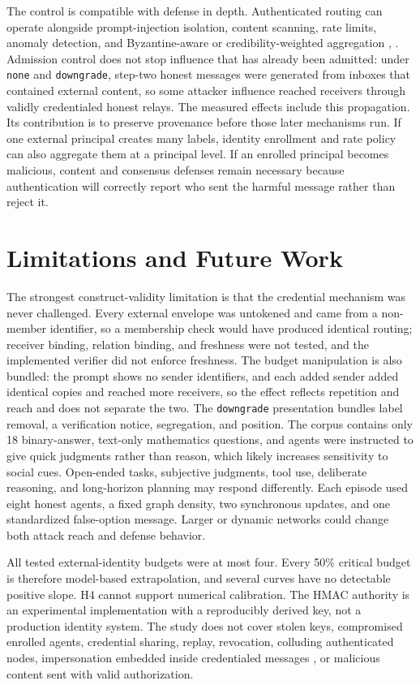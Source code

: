 \documentclass[11pt]{article}
\begin{document}
The control is compatible with defense in depth. Authenticated routing can operate alongside prompt-injection isolation, content scanning, rate limits, anomaly detection, and Byzantine-aware or credibility-weighted aggregation \cite{zheng2025byzantine}, \cite{ebrahimi2025credibility}. Admission control does not stop influence that has already been admitted: under \texttt{none} and \texttt{downgrade}, step-two honest messages were generated from inboxes that contained external content, so some attacker influence reached receivers through validly credentialed honest relays. The measured effects include this propagation. Its contribution is to preserve provenance before those later mechanisms run. If one external principal creates many labels, identity enrollment and rate policy can also aggregate them at a principal level. If an enrolled principal becomes malicious, content and consensus defenses remain necessary because authentication will correctly report who sent the harmful message rather than reject it.

\section{Limitations and Future Work}

The strongest construct-validity limitation is that the credential mechanism was never challenged. Every external envelope was untokened and came from a non-member identifier, so a membership check would have produced identical routing; receiver binding, relation binding, and freshness were not tested, and the implemented verifier did not enforce freshness. The budget manipulation is also bundled: the prompt shows no sender identifiers, and each added sender added identical copies and reached more receivers, so the effect reflects repetition and reach and does not separate the two. The \texttt{downgrade} presentation bundles label removal, a verification notice, segregation, and position. The corpus contains only 18 binary-answer, text-only mathematics questions, and agents were instructed to give quick judgments rather than reason, which likely increases sensitivity to social cues. Open-ended tasks, subjective judgments, tool use, deliberate reasoning, and long-horizon planning may respond differently. Each episode used eight honest agents, a fixed graph density, two synchronous updates, and one standardized false-option message. Larger or dynamic networks could change both attack reach and defense behavior.

All tested external-identity budgets were at most four. Every 50\% critical budget is therefore model-based extrapolation, and several curves have no detectable positive slope. H4 cannot support numerical calibration. The HMAC authority is an experimental implementation with a reproducibly derived key, not a production identity system. The study does not cover stolen keys, compromised enrolled agents, credential sharing, replay, revocation, colluding authenticated nodes, impersonation embedded inside credentialed messages \cite{cui2025madspear}, or malicious content sent with valid authorization.
\end{document}

